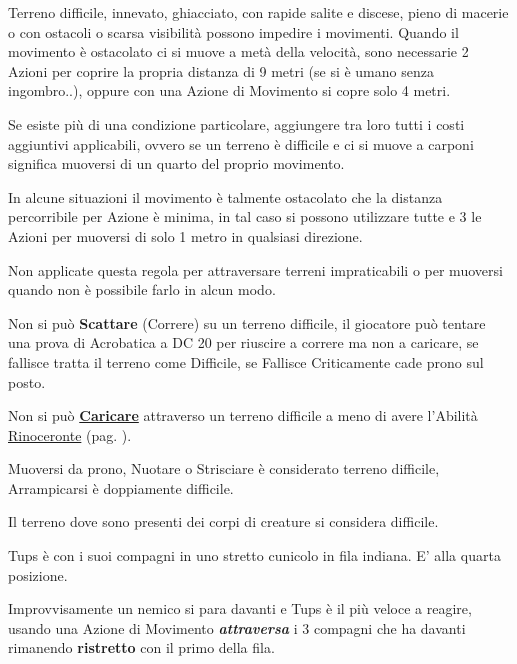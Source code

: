 \begin{multicols}{2}
Terreno difficile, innevato, ghiacciato, con rapide salite e discese, pieno di macerie o con ostacoli o scarsa visibilità possono impedire i movimenti. Quando il movimento è ostacolato ci si muove a metà della velocità, sono necessarie 2 Azioni per coprire la propria distanza di 9 metri (se si è umano senza ingombro..), oppure con una Azione di Movimento si copre solo 4 metri.

Se esiste più di una condizione particolare, aggiungere tra loro tutti i costi aggiuntivi applicabili, ovvero se un terreno è difficile e ci si muove a carponi significa muoversi di un quarto del proprio movimento. 

In alcune situazioni il movimento è talmente ostacolato che la distanza percorribile per Azione è minima, in tal caso si possono utilizzare tutte e 3 le Azioni per muoversi di solo 1 metro in qualsiasi direzione.

Non applicate questa regola per attraversare terreni impraticabili o per muoversi quando non è possibile farlo in alcun modo.

Non si può \textbf{Scattare} (Correre) su un terreno difficile, il giocatore può tentare una prova di Acrobatica a DC 20 per riuscire a correre ma non a caricare, se fallisce tratta il terreno come Difficile, se Fallisce Criticamente cade prono sul posto. 

Non si può \hyperlink{carica}{\textbf{Caricare}} attraverso un terreno difficile a meno di avere l'Abilità \hyperlink{Rinoceronte}{Rinoceronte} (pag. \pageref{Rinoceronte}).

Muoversi da prono, Nuotare o Strisciare è considerato terreno difficile, Arrampicarsi è doppiamente difficile.

Il terreno dove sono presenti dei corpi di creature si considera difficile. 

\begin{giocatore} %
Tups è con i suoi compagni in uno stretto cunicolo in fila indiana. E' alla quarta posizione.

Improvvisamente un nemico si para davanti e Tups è il più veloce a reagire, usando una Azione di Movimento \emph{\textbf{attraversa}} i 3 compagni che ha davanti rimanendo \textbf{ristretto} con il primo della fila.


\end{giocatore}
\end{multicols}
